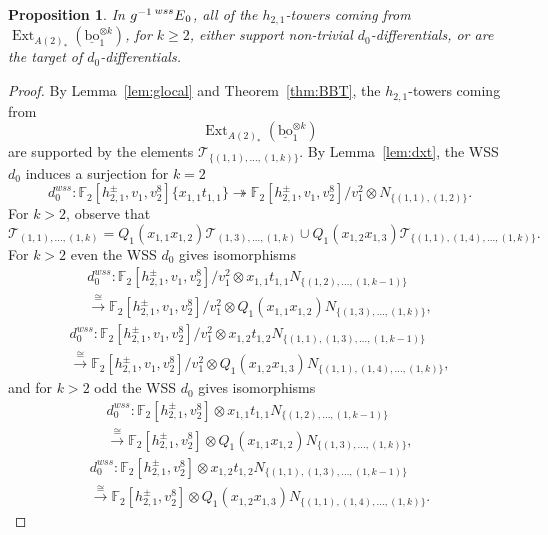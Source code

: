 \documentclass[10pt]{amsart}
\newcommand{\mc}[1]{\mathcal{#1}}
\newcommand{\ul}[1]{\underline{#1}}
\newcommand{\FF}{\mathbb{F}}
\newcommand{\bo}{\mathrm{bo}}
\newcommand{\bou}{\ul{\bo}}
\newtheorem{prop}[equation]{Proposition}
\theoremstyle{definition}
\numberwithin{equation}{section}
\numberwithin{figure}{section}
\DeclareMathOperator{\Ext}{Ext}
\newcommand{\E}[2]{\prescript{#1}{#2}{E}}
\begin{document}
\begin{prop}\label{prop:h21death}
In $g^{-1}\E{wss}{}_0$, all of the $h_{2,1}$-towers coming from $\Ext_{A(2)_*}(\bou_1^{\otimes k})$, for $k \ge 2$, either support non-trivial $d_0$-differentials, or are the target of $d_0$-differentials.
\end{prop}

\begin{proof}
By Lemma~\ref{lem:glocal} and Theorem~\ref{thm:BBT}, the $h_{2,1}$-towers coming from 
$$\Ext_{A(2)_*}(\bou_1^{\otimes k})$$ 
are supported by the elements
$\mc{T}_{\{(1,1), \ldots, (1,k)\}}$.
By Lemma~\ref{lem:dxt}, the WSS $d_0$ induces a surjection for $k = 2$
$$ d_0^{wss}: \FF_2[h_{2,1}^{\pm}, v_1, v_2^8]\{x_{1,1}t_{1,1}\} \twoheadrightarrow \FF_2[h_{2,1}^{\pm}, v_1, v_2^8]/v_1^2 \otimes N_{\{(1,1), (1,2)\}}. $$
For $k > 2$, observe that
$$ \mc{T}_{(1,1), \ldots, (1,k)} = Q_1(x_{1,1}x_{1,2})\mc{T}_{(1,3), \ldots, (1,k)} \cup Q_1(x_{1,2}x_{1,3}) \mc{T}_{\{(1,1), (1,4), \ldots, (1,k) \}}. $$
For $k>2$ even the WSS $d_0$ gives isomorphisms
\begin{multline*}
d_0^{wss}: \FF_2[h_{2,1}^{\pm}, v_1, v_2^8]/v_1^2 \otimes x_{1,1}t_{1,1}N_{\{(1,2), \ldots, (1,k-1)\}} \\
\xrightarrow{\cong} \FF_2[h_{2,1}^{\pm}, v_1, v_2^8]/v_1^2 \otimes Q_1(x_{1,1}x_{1,2})N_{\{(1,3), \ldots, (1,k)\}},
\end{multline*}
\begin{multline*}
d_0^{wss}: \FF_2[h_{2,1}^{\pm}, v_1, v_2^8]/v_1^2 \otimes x_{1,2}t_{1,2}N_{\{(1,1),(1,3), \ldots, (1,k-1)\}} \\
\xrightarrow{\cong} \FF_2[h_{2,1}^{\pm}, v_1, v_2^8]/v_1^2 \otimes Q_1(x_{1,2}x_{1,3})N_{\{(1,1),(1,4),\ldots, (1,k)\}},
\end{multline*}
and for $k > 2$ odd the WSS $d_0$ gives isomorphisms
\begin{multline*}
d_0^{wss}: \FF_2[h_{2,1}^{\pm}, v_2^8] \otimes x_{1,1}t_{1,1}N_{\{(1,2), \ldots, (1,k-1)\}} \\ 
\xrightarrow{\cong} \FF_2[h_{2,1}^{\pm}, v_2^8] \otimes Q_1(x_{1,1}x_{1,2})N_{\{(1,3), \ldots, (1,k)\}},
\end{multline*}
\begin{multline*}
d_0^{wss}: \FF_2[h_{2,1}^{\pm}, v_2^8] \otimes x_{1,2}t_{1,2}N_{\{(1,1),(1,3), \ldots, (1,k-1)\}} \\ \xrightarrow{\cong} \FF_2[h_{2,1}^{\pm}, v_2^8] \otimes Q_1(x_{1,2}x_{1,3})N_{\{(1,1),(1,4),\ldots, (1,k)\}}.
\end{multline*}
\end{proof}
\end{document}
